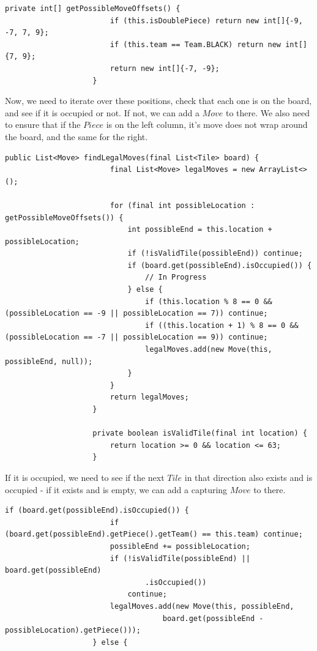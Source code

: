 \documentclass[a4paper]{report}
\begin{document}
				\begin{lstlisting}[gobble=20, frame=top, caption=Piece.java]
					private int[] getPossibleMoveOffsets() {
						if (this.isDoublePiece) return new int[]{-9, -7, 7, 9};
						if (this.team == Team.BLACK) return new int[]{7, 9};
						return new int[]{-7, -9};
					}
				\end{lstlisting} \bigskip
				
				Now, we need to iterate over these positions, check that each one is on the board, and see if it is occupied or not. If not, we can add a $Move$ to there. We also need to ensure that if the $Piece$ is on the left column, it's move does not wrap around the board, and the same for the right.
				
				\begin{lstlisting}[gobble=20, frame=top, caption=Piece.java]
					public List<Move> findLegalMoves(final List<Tile> board) {
						final List<Move> legalMoves = new ArrayList<>();
						
						for (final int possibleLocation : getPossibleMoveOffsets()) {
							int possibleEnd = this.location + possibleLocation;
							if (!isValidTile(possibleEnd)) continue;
							if (board.get(possibleEnd).isOccupied()) {
								// In Progress
							} else {
								if (this.location % 8 == 0 && (possibleLocation == -9 || possibleLocation == 7)) continue;
								if ((this.location + 1) % 8 == 0 && (possibleLocation == -7 || possibleLocation == 9)) continue;
								legalMoves.add(new Move(this, possibleEnd, null));
							}
						}
						return legalMoves;
					}
					
					private boolean isValidTile(final int location) {
						return location >= 0 && location <= 63;
					}
				\end{lstlisting}
				
				If it is occupied, we need to see if the next $Tile$ in that direction also exists and is occupied - if it exists and is empty, we can add a capturing $Move$ to there.
				
				\begin{lstlisting}[gobble=20, frame=top, caption=Piece.java]
					if (board.get(possibleEnd).isOccupied()) {
						if (board.get(possibleEnd).getPiece().getTeam() == this.team) continue;
						possibleEnd += possibleLocation;
						if (!isValidTile(possibleEnd) || board.get(possibleEnd)
								.isOccupied())
							continue;
						legalMoves.add(new Move(this, possibleEnd, 
									board.get(possibleEnd - possibleLocation).getPiece()));
					} else {
				\end{lstlisting} \bigskip
				
\end{document}
